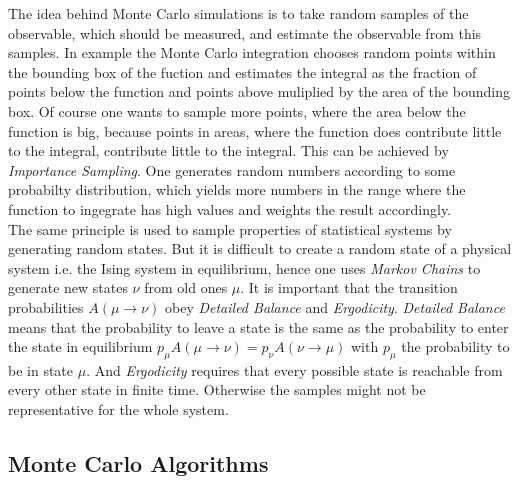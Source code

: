 \label{sec:montecarlo}
The idea behind Monte Carlo simulations is to take random samples of
the observable, which should be measured, and estimate the observable from
this samples. In example the Monte Carlo integration chooses random
points within the bounding box of the fuction and estimates the integral
as the fraction of points below the function and points above muliplied
by the area of the bounding box.
Of course one wants to sample more points, where the area below the
function is big, because points in areas, where the function does
contribute little to the integral, contribute little to the integral.
This can be achieved by \emph{Importance Sampling}. One
generates random numbers according to some probabilty distribution, which
yields more numbers in the range where the function to ingegrate has high
values and weights the result accordingly.\\
The same principle is used to sample properties of statistical systems
by generating random states.
But it is difficult to create a random state of a physical system i.e. the
Ising system in equilibrium, hence one uses \emph{Markov Chains} to
generate new states \(\nu\) from old ones \(\mu\).
It is important that the transition probabilities \(A(\mu \to \nu)\)
obey \emph{Detailed Balance} and \emph{Ergodicity}.
\emph{Detailed Balance} means  that the probability to leave a state is
the same as the probability to enter the state in equilibrium
\(p_\mu A(\mu \to \nu) = p_\nu A(\nu \to \mu)\) with \(p_\mu\) the
probability to be in state \(\mu\).
And \emph{Ergodicity} requires that every possible state is reachable
from every other state in finite time. \cite{NewmanBarkema1999} \cite{Katzgraber2011}
Otherwise the samples might not be representative for the whole system.\\

\subsection{Monte Carlo Algorithms}
